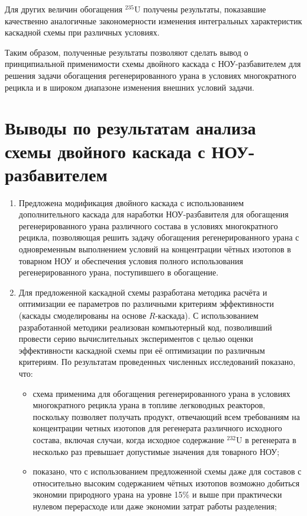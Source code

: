 Для других величин обогащения $^{235}$U получены результаты, показавшие качественно аналогичные закономерности изменения интегральных характеристик каскадной схемы при различных условиях. 

Таким образом, полученные результаты позволяют сделать вывод о принципиальной применимости схемы двойного каскада с НОУ-разбавителем для решения задачи обогащения регенерированного урана в условиях многократного рецикла и в широком диапазоне изменения внешних условий задачи.    

\section{Выводы по результатам анализа схемы двойного каскада с НОУ-разбавителем}

\begin{enumerate}
    \item Предложена модификация двойного каскада с использованием дополнительного каскада для наработки НОУ-разбавителя для обогащения регенерированного урана различного состава в условиях многократного рецикла, позволяющая решить задачу обогащения регенерированного урана с одновременным выполнением условий на концентрации чётных изотопов в товарном НОУ и обеспечения условия полного использования регенерированного урана, поступившего в обогащение.
    \item Для предложенной каскадной схемы разработана методика расчёта и оптимизации ее параметров по различными критериям эффективности (каскады смоделированы на основе $R$-каскада). С использованием разработанной методики реализован компьютерный код, позволивший провести серию вычислительных экспериментов с целью оценки эффективности каскадной схемы при её оптимизации по различным критериям. По результатам проведенных численных исследований показано, что:
    \begin{itemize}
        \item схема применима для обогащения регенерированного урана в условиях многократного рецикла урана в топливе легководных реакторов, поскольку позволяет получать продукт, отвечающий всем требованиям на концентрации четных изотопов для регенерата различного исходного состава, включая случаи, когда исходное содержание $^{232}$U в регенерата в несколько раз превышает допустимые значения для товарного НОУ;
        \item показано, что с использованием предложенной схемы даже для составов с относительно высоким содержанием чётных изотопов возможно добиться экономии природного урана на уровне 15\% и выше при практически нулевом перерасходе или даже экономии затрат работы разделения;

\end{itemize}
\end{enumerate}

